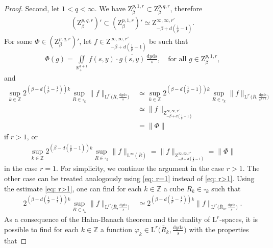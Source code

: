 \documentclass[10pt,a4paper]{amsart}
\newcommand{\IR}{\mathbb{R}}
\newcommand{\IZ}{\mathbb{Z}}
\renewcommand{\L}{\mathrm{L}}
\newcommand{\Z}{\mathrm{Z}}
\renewcommand{\d}{\mathrm{d}}
\begin{document}
\begin{proof}
    \noindent Second, let $1< q <\infty$. We have $\Z^{p,1,r}_\beta\subset \Z^{p,q,r}_\beta$, therefore
    \begin{align*}
        (\Z^{p,q,r}_\beta)'\subset(\Z^{p,1,r}_\beta)' \simeq \Z^{\infty,\infty,r'}_{-\beta+d(\frac{1}{p}-1)}.
    \end{align*}
    For some $\Phi \in (\Z^{p,q,r}_\beta)'$, let $f\in \Z^{\infty,\infty,r'}_{-\beta+d(\frac{1}{p}-1)}$ be such that
    \begin{align}
    \label{eq: phi identity}
        \Phi(g) = \iint\limits_{\IR^{d+1}_+} f(s,y) \cdot \overline{g(s,y)} \,\frac{\d y \d s}{s},\quad \text{for all $g \in \Z^{p,1,r}_\beta$},
    \end{align}
    and
    \begin{align}
    \label{eq: r>1}
        \sup\limits_{k\in\IZ}2^{(\beta-d(\frac{1}{p}-\frac{1}{r}))k} \sup\limits_{R\in\square_k} \|f\|_{\L^{r'}\big(\bar R, \frac{\d y \d s}{s}\big)} &\simeq \sup\limits_{k\in\IZ}2^{(\beta-d(\frac{1}{p}-1))k} \sup\limits_{R\in\square_k} \|f\|_{\L^{r'}\big(\bar R, \frac{\d y \d s}{s^{d+1}}\big)} \nonumber\\
        &\simeq \|f\|_{\Z^{\infty,\infty,r'}_{-\beta+d(\frac{1}{p}-1)}}\\
        &= \|\Phi\|\nonumber
    \end{align}
    if $r>1$, or
    \begin{align}
    \label{eq: r=1}
        \sup\limits_{k\in\IZ}2^{(\beta-d(\frac{1}{p}-1))k} \sup\limits_{R\in\square_k} \|f\|_{\L^{\infty}(\bar R)} = \|f\|_{\Z^{\infty,\infty,r'}_{-\beta+d(\frac{1}{p}-1)}} = \|\Phi\|
    \end{align}
    in the case $r=1$. For simplicity, we continue the argument in the case $r>1$. The other case can be treated analogously using \eqref{eq: r=1} instead of \eqref{eq: r>1}.
    Using the estimate \eqref{eq: r>1}, one can find for each $k\in\IZ$ a cube $R_k\in \square_k$ such that
    \begin{align}
    \label{eq: compare sup with pointwise}
         2^{(\beta-d(\frac{1}{p}-\frac{1}{r}))k} \sup\limits_{R\in\square_k} \|f\|_{\L^{r'}\big(\bar R, \frac{\d y \d s}{s}\big)}
        &\simeq 2^{(\beta-d(\frac{1}{p}-\frac{1}{r}))k} \|f\|_{\L^{r'}\big(\bar R_k, \frac{\d y \d s}{s}\big)}.
    \end{align}
    As a consequence of the Hahn-Banach theorem and the duality of $\L^r$-spaces, it is possible to find for each $k\in\IZ$ a function $\varphi_k\in \L^{r}\big(\bar R_k, \frac{\d y \d s}{s}\big)$ with the properties that

\end{proof}
\end{document}
